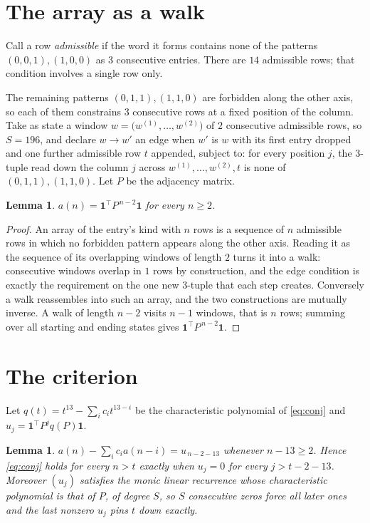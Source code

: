\documentclass[11pt,a4paper]{article}
\theoremstyle{plain}
\newtheorem{lemma}[theorem]{Lemma}
\theoremstyle{definition}
\begin{document}
\section{The array as a walk}

Call a row \emph{admissible} if the word it forms contains none of the patterns
$(0,0,1), (1,0,0)$ as $3$ consecutive entries. There are $14$ admissible rows; that condition
involves a single row only.

The remaining patterns $(0,1,1), (1,1,0)$ are forbidden along the other axis, so each of them
constrains $3$ consecutive rows at a fixed position of the column. Take as state a
window $w=\bigl(w^{(1)},\dots,w^{(2)}\bigr)$ of $2$ consecutive admissible
rows, so $S=196$, and declare $w\to w'$ an edge when $w'$ is $w$ with its first entry
dropped and one further admissible row $t$ appended, subject to: for every position
$j$, the $3$-tuple read down the column $j$ across $w^{(1)},\dots,w^{(2)},t$
is none of $(0,1,1), (1,1,0)$. Let $P$ be the adjacency matrix.

\begin{lemma}\label{lem:walk}
$a(n)=\mathbf{1}^{\!\top}P^{\,n-2}\mathbf{1}$ for every $n\ge2$.
\end{lemma}

\begin{proof}
An array of the entry's kind with $n$ rows is a sequence of $n$ admissible rows in
which no forbidden pattern appears along the other axis. Reading it as the sequence of its
overlapping windows of length $2$ turns it into a walk: consecutive windows overlap in
$1$ rows by construction, and the edge condition is exactly the requirement on the one
new $3$-tuple that each step creates. Conversely a walk reassembles into such an array,
and the two constructions are mutually inverse. A walk of length $n-2$ visits $n-1$
windows, that is $n$ rows; summing over all starting and ending states gives
$\mathbf{1}^{\!\top}P^{\,n-2}\mathbf{1}$.
\end{proof}

\section{The criterion}

Let $q(t)=t^{13}-\sum_i c_i t^{13-i}$ be the characteristic polynomial of
\eqref{eq:conj} and $u_j=\mathbf{1}^{\!\top}P^{j}q(P)\mathbf{1}$.

\begin{lemma}\label{lem:crit}
$a(n)-\sum_i c_i a(n-i)=u_{\,n-2-13}$ whenever $n-13\ge2$. Hence
\eqref{eq:conj} holds for every $n>t$ exactly when $u_j=0$ for every
$j>t-2-13$. Moreover $(u_j)$ satisfies the monic linear recurrence whose
characteristic polynomial is that of $P$, of degree $S$, so $S$ consecutive zeros force all
later ones and the last nonzero $u_j$ pins $t$ down exactly.
\end{lemma}
\end{document}
